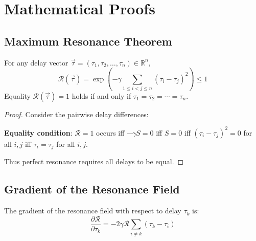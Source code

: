 \section{Mathematical Proofs}
\label{sec:proofs}

\subsection{Maximum Resonance Theorem}

\begin{theorem}
\label{thm:max_resonance}
For any delay vector $\vec{\tau} = (\tau_1, \tau_2, \dots, \tau_n) \in \mathbb{R}^n$,
\[
\mathcal{R}(\vec{\tau}) = \exp\left(-\gamma \sum_{1 \leq i < j \leq n} (\tau_i - \tau_j)^2\right) \leq 1
\]
Equality $\mathcal{R}(\vec{\tau}) = 1$ holds if and only if $\tau_1 = \tau_2 = \cdots = \tau_n$.
\end{theorem}

\begin{proof}
Consider the pairwise delay differences:
\]

\textbf{Equality condition}: 
$\mathcal{R} = 1$ occurs iff $-\gamma S = 0$ iff $S = 0$ iff $(\tau_i - \tau_j)^2 = 0$ for all $i,j$ iff $\tau_i = \tau_j$ for all $i,j$. 

Thus perfect resonance requires all delays to be equal.
\end{proof}

\subsection{Gradient of the Resonance Field}

\begin{theorem}
\label{thm:gradient}
The gradient of the resonance field with respect to delay $\tau_k$ is:
\[
\frac{\partial \mathcal{R}}{\partial \tau_k} = -2\gamma \mathcal{R} \sum_{i \neq k} (\tau_k - \tau_i)
\]
\end{theorem}

